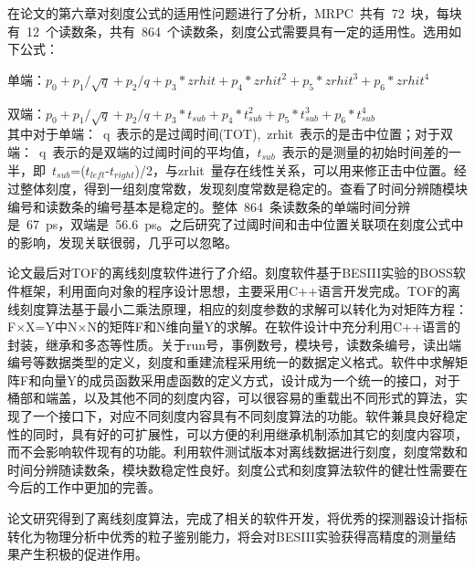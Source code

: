 在论文的第六章对刻度公式的适用性问题进行了分析，MRPC~共有~72~块，每块有~12~个读数条，共有~864~个读数条，刻度公式需要具有一定的适用性。选用如下公式：

单端：$p_{0}+p_{1}/\sqrt{q}+p_{2}/q+p_{3}*zrhit+p_{4}*zrhit^{2}+p_{5}*zrhit^{3}+p_{6}*zrhit^{4}$

双端：$p_{0}+p_{1}/\sqrt{q}+p_{2}/q+p_{3}*t_{sub}+p_{4}*t_{sub}^{2}+p_{5}*t_{sub}^{3}+p_{6}*t_{sub}^{4}$\\
其中对于单端：~q~表示的是过阈时间(TOT),~zrhit~表示的是击中位置；对于双端：~q~表示的是双端的过阈时间的平均值，$t_{sub}$~表示的是测量的初始时间差的一半，即~$t_{sub}$=($t_{left}$-$t_{right}$)/2，与zrhit~量存在线性关系，可以用来修正击中位置。经过整体刻度，得到一组刻度常数，发现刻度常数是稳定的。查看了时间分辨随模块编号和读数条的编号基本是稳定的。整体~864~条读数条的单端时间分辨是~67~ps，双端是~56.6~ps。之后研究了过阈时间和击中位置关联项在刻度公式中的影响，发现关联很弱，几乎可以忽略。

论文最后对TOF的离线刻度软件进行了介绍。刻度软件基于BESIII实验的BOSS软件框架，利用面向对象的程序设计思想，主要采用C++语言开发完成。TOF的离线刻度算法基于最小二乘法原理，相应的刻度参数的求解可以转化为对矩阵方程：F$\times$X=Y中N$\times$N的矩阵F和N维向量Y的求解。在软件设计中充分利用C++语言的封装，继承和多态等性质。关于run号，事例数号，模块号，读数条编号，读出端编号等数据类型的定义，刻度和重建流程采用统一的数据定义格式。软件中求解矩阵F和向量Y的成员函数采用虚函数的定义方式，设计成为一个统一的接口，对于桶部和端盖，以及其他不同的刻度内容，可以很容易的重载出不同形式的算法，实现了一个接口下，对应不同刻度内容具有不同刻度算法的功能。软件兼具良好稳定性的同时，具有好的可扩展性，可以方便的利用继承机制添加其它的刻度内容项，而不会影响软件现有的功能。利用软件测试版本对离线数据进行刻度，刻度常数和时间分辨随读数条，模块数稳定性良好。刻度公式和刻度算法软件的健壮性需要在今后的工作中更加的完善。

论文研究得到了离线刻度算法，完成了相关的软件开发，将优秀的探测器设计指标转化为物理分析中优秀的粒子鉴别能力，将会对BESIII实验获得高精度的测量结果产生积极的促进作用。

\begin{comment}
论文利用~BESIII~获取的~Bhabha~事例真实数据刻度样本，对升级改造后的~MRPC~端盖~TOF~的离线数据刻度算法进行了研究，确定了刻度的流程，构造了合理的刻度公式，完成了相关的软件开发工作，刻度后得到的单条的时间分辨双端达到~53.5~ps,整体~72~个模块~864~条的双端时间分辨达到~56.6~ps，优于原来的端盖闪烁体的时间分辨(110~ps)。国际上另外使用~MRPC~作为飞行时间探测器的~STAR~实验和~ALICE~实验选用刻度样本是~$\pi$介子，时间分辨分别为~75~ps和~80~ps。

MRPC端盖TOF离线数据刻度算法是基于BOSS软件平台，利用面向对象思想开发的软件包，对原始数据中的噪声本底具有一定的排除能力。但是由于加速器和探测器的复杂性，原始数据中的本底情况可能具有很大差别，刻度算法软件的健壮性需要在日常刻度工作中逐步完善。本次研究得到的离线刻度算法，将优秀的探测器硬件指标转化为物理分析中优秀的粒子鉴别能力，将会对BESIII实验获得高精度的测量结果产生积极的促进作用。
\end{comment}












